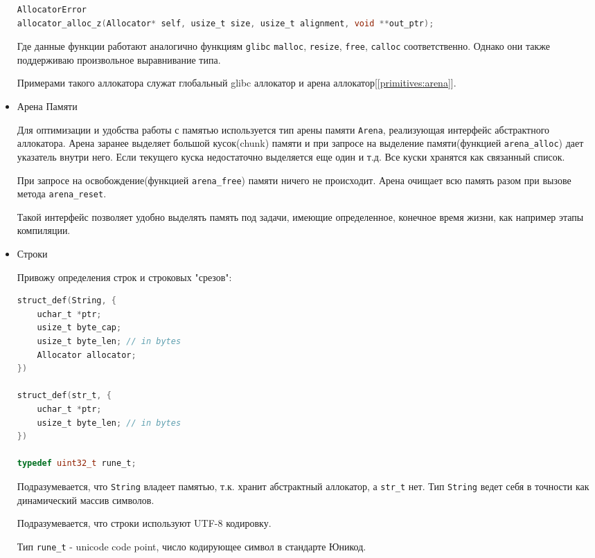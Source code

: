 \begin{itemize}
\begin{lstlisting}[language=c, caption={Макросы обработки ошибок}, label={primitives:error-macros}]
AllocatorError
allocator_alloc_z(Allocator* self, usize_t size, usize_t alignment, void **out_ptr);
\end{lstlisting} 

Где данные функции работают аналогично функциям \verb|glibc| \verb|malloc|, \verb|resize|, \verb|free|, \verb|calloc| соответственно.
Однако они также поддерживаю произвольное выравнивание типа.

Примерами такого аллокатора служат глобальный glibc аллокатор и арена аллокатор[\ref{primitives:arena}].

\item\label{primitives:arena} Арена Памяти

Для оптимизации и удобства работы с памятью используется тип арены памяти \verb|Arena|, реализующая интерфейс абстрактного аллокатора.
Арена заранее выделяет большой кусок(chunk) памяти и при запросе на выделение памяти(функцией \verb|arena_alloc|) дает указатель внутри него. Если текущего куска недостаточно выделяется еще один и т.д.
Все куски хранятся как связанный список.

При запросе на освобождение(функцией \verb|arena_free|) памяти ничего не происходит. Арена очищает всю память разом при вызове метода \verb|arena_reset|.

Такой интерфейс позволяет удобно выделять память под задачи, имеющие определенное, конечное время жизни, как например этапы компиляции.

\item Строки

Привожу определения строк и строковых "срезов":

\begin{lstlisting}[language=c, caption={Строки и строковые срезы}, label={primitives:string-struct}]
struct_def(String, {
    uchar_t *ptr;
    usize_t byte_cap;
    usize_t byte_len; // in bytes
    Allocator allocator;
})

struct_def(str_t, {
    uchar_t *ptr;
    usize_t byte_len; // in bytes
})

typedef uint32_t rune_t;
\end{lstlisting}

Подразумевается, что \verb|String| владеет памятью, т.к. хранит абстрактный аллокатор, а \verb|str_t| нет.
Тип \verb|String| ведет себя в точности как динамический массив символов.

Подразумевается, что строки используют UTF-8 кодировку.

Тип \verb|rune_t| - unicode code point, число кодирующее символ в стандарте Юникод.


\end{itemize}
